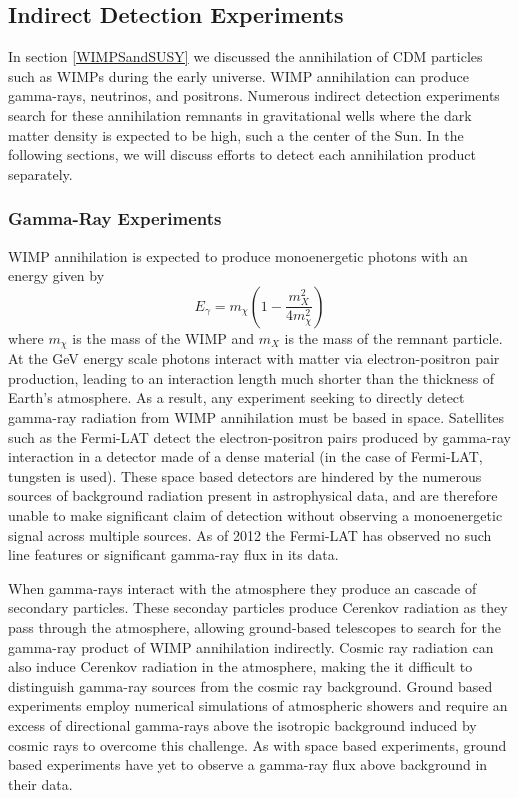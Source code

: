 \documentclass[a4paper,12pt]{article}
\begin{document}
\subsection{Indirect Detection Experiments}

In section \ref{WIMPSandSUSY} we discussed the annihilation of CDM particles such as WIMPs during the early universe.  WIMP annihilation can produce gamma-rays, neutrinos, and positrons.  Numerous indirect detection experiments search for these annihilation remnants in gravitational wells where the dark matter density is expected to be high, such a the center of the Sun.  In the following sections, we will discuss efforts to detect each annihilation product separately.

\subsubsection{Gamma-Ray Experiments}

WIMP annihilation is expected to produce monoenergetic photons with an energy given by
\begin{equation} \label{WIMP-penergy}
E_{\gamma} = m_{\chi} (1-\frac{m_X^2}{4m_\chi^2})
\end{equation}
where $m_\chi$ is the mass of the WIMP and $m_X$ is the mass of the remnant particle.  At the GeV energy scale photons interact with matter via electron-positron pair production, leading to an interaction length much shorter than the thickness of Earth's atmosphere.  As a result, any experiment seeking to directly detect gamma-ray radiation from WIMP annihilation must be based in space.  Satellites such as the Fermi-LAT detect the electron-positron pairs produced by gamma-ray interaction in a detector made of a dense material (in the case of Fermi-LAT, tungsten is used).  These space based detectors are hindered by the numerous sources of background radiation present in astrophysical data, and are therefore unable to make significant claim of detection without observing a monoenergetic signal across multiple sources.  As of 2012 the Fermi-LAT has observed no such line features or significant gamma-ray flux in its data. \cite{Fermi-LAT} 

When gamma-rays interact with the atmosphere they produce an cascade of secondary particles.  These seconday particles produce Cerenkov radiation as they pass through the atmosphere, allowing ground-based telescopes to search for the gamma-ray product of WIMP annihilation indirectly.  Cosmic ray radiation can also induce Cerenkov radiation in the atmosphere, making the it difficult to distinguish gamma-ray sources from the cosmic ray background.  Ground based experiments employ numerical simulations of atmospheric showers and require an excess of directional gamma-rays above the isotropic background induced by cosmic rays to overcome this challenge. \cite{Knapp}  As with space based experiments, ground based experiments have yet to observe a gamma-ray flux above background in their data. \cite{HESS, VERITAS}
\end{document}
